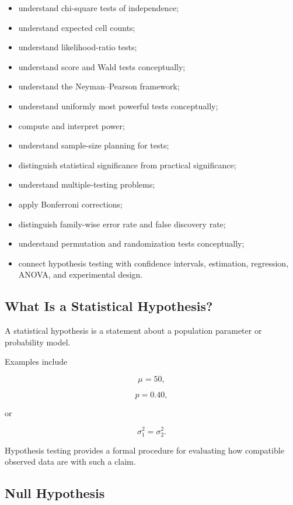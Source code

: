 {\begin{itemize}
    \item understand chi-square tests of independence;
    \item understand expected cell counts;
    \item understand likelihood-ratio tests;
    \item understand score and Wald tests conceptually;
    \item understand the Neyman--Pearson framework;
    \item understand uniformly most powerful tests conceptually;
    \item compute and interpret power;
    \item understand sample-size planning for tests;
    \item distinguish statistical significance from practical
          significance;
    \item understand multiple-testing problems;
    \item apply Bonferroni corrections;
    \item distinguish family-wise error rate and false discovery rate;
    \item understand permutation and randomization tests conceptually;
    \item connect hypothesis testing with confidence intervals,
          estimation, regression, ANOVA, and experimental design.
\end{itemize}
}

\subsection{What Is a Statistical Hypothesis?}
\label{subsec:what-is-statistical-hypothesis}

A statistical hypothesis is a statement about a population parameter or
probability model.

Examples include

\[
\mu=50,
\]

\[
p=0.40,
\]

or

\[
\sigma_1^2=\sigma_2^2.
\]

Hypothesis testing provides a formal procedure for evaluating how
compatible observed data are with such a claim.

\subsection{Null Hypothesis}
\label{subsec:null-hypothesis}

